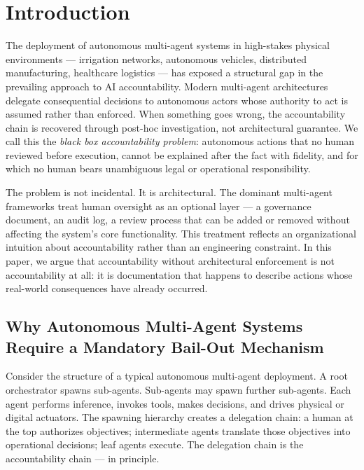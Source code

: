 \section{Introduction}
\label{sec:introduction}

The deployment of autonomous multi-agent systems in high-stakes physical environments — irrigation networks, autonomous vehicles, distributed manufacturing, healthcare logistics — has exposed a structural gap in the prevailing approach to AI accountability. Modern multi-agent architectures delegate consequential decisions to autonomous actors whose authority to act is assumed rather than enforced. When something goes wrong, the accountability chain is recovered through post-hoc investigation, not architectural guarantee. We call this the \textit{black box accountability problem}: autonomous actions that no human reviewed before execution, cannot be explained after the fact with fidelity, and for which no human bears unambiguous legal or operational responsibility.

The problem is not incidental. It is architectural. The dominant multi-agent frameworks treat human oversight as an optional layer — a governance document, an audit log, a review process that can be added or removed without affecting the system's core functionality. This treatment reflects an organizational intuition about accountability rather than an engineering constraint. In this paper, we argue that accountability without architectural enforcement is not accountability at all: it is documentation that happens to describe actions whose real-world consequences have already occurred.

\subsection*{Why Autonomous Multi-Agent Systems Require a Mandatory Bail-Out Mechanism}
\label{sec:intro:why-mandatory}

Consider the structure of a typical autonomous multi-agent deployment. A root orchestrator spawns sub-agents. Sub-agents may spawn further sub-agents. Each agent performs inference, invokes tools, makes decisions, and drives physical or digital actuators. The spawning hierarchy creates a delegation chain: a human at the top authorizes objectives; intermediate agents translate those objectives into operational decisions; leaf agents execute. The delegation chain is the accountability chain — in principle.

